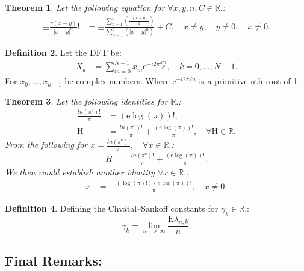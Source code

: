 \documentclass[10pt]{article}
\theoremstyle{plain}
\newtheorem{theorem}{Theorem}[section]
\theoremstyle{definition}
\newtheorem{definition}[theorem]{Definition}
\theoremstyle{remark}
\begin{document}
\begin{theorem}
	Let the following equation for $\forall x, y, n, C \in \mathbb{R}.$:
	\begin{align*}
		\pm \frac{\gamma(x-y)}{|x - y|^{n}}! &= \pm \frac{\sum_{n=1}^{p}(\frac{\gamma(x-y)}{1})}{\sum_{n=1}^{p}(|x - y|^{n})} + C, \quad x \neq y, \quad y \neq 0, \quad x \neq 0.
	\end{align*}
\end{theorem}

\begin{definition}
	Let the DFT be:
	\begin{align*}
		X_k &= \sum_{m=0}^{N-1} x_{m}\mathrm{e}^{-i2\pi \frac{km}{N}}, \quad k = 0,\dots,N-1.
	\end{align*}
	For $x_{0}, \dots, x_{n-1}$ be complex numbers. Where $\mathrm{e}^{-i2\pi /n}$ is a primitive nth root of 1.
\end{definition}

\begin{theorem}
	Let the following identities for $\mathbb{R}.$:
	\begin{align*}
		\frac{ln(\pi^\mathrm{e})!}{\pi} &= (\mathrm{e} \log(\pi))!,\\
		\mathrm{H} &= \frac{ln(\pi^\mathrm{e})!}{\pi} + \frac{(\mathrm{e} \log(\pi))!}{\pi}, \quad \forall \mathrm{H} \in \mathbb{R}.
	\end{align*}
	From the following for $x = \frac{ln(\pi^\mathrm{e})!}{\pi}, \quad \forall x \in \mathbb{R}.$:
	\begin{align*}
	H &= \frac{ln(\pi^\mathrm{e})!}{\pi} + \frac{(\mathrm{e} \log(\pi))!}{\pi}.
	\end{align*}
	We then would establish another identity $\forall x \in \mathbb{R}.$:
	\begin{align*}
		x &= -\frac{(\log(\pi)!) (e \log(\pi))!}{\pi}, \quad x \neq 0.
	\end{align*}
\end{theorem}

\begin{definition}
	Defining the Chvátal–Sankoff constants for $\gamma_k \in \mathbb{R}.$:
	\begin{equation}
		\gamma_k = \lim_{n -> \infty} \frac{\mathrm{E}{\lambda_{n, k}}}{n}.
	\end{equation}
\end{definition}

\subsection{Final Remarks:}
\end{document}
